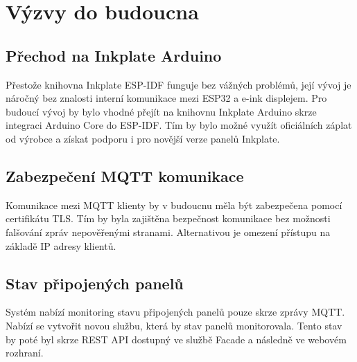 \chapter{Výzvy do budoucna}

\section{Přechod na Inkplate Arduino}
Přestože knihovna Inkplate ESP-IDF funguje bez vážných problémů, její vývoj je náročný bez znalosti interní komunikace mezi ESP32 a e-ink displejem. Pro budoucí vývoj by bylo vhodné přejít na knihovnu Inkplate Arduino skrze integraci Arduino Core do ESP-IDF. Tím by bylo možné využít oficiálních záplat od výrobce a získat podporu i pro novější verze panelů Inkplate.

\section{Zabezpečení MQTT komunikace}
Komunikace mezi MQTT klienty by v budoucnu měla být zabezpečena pomocí certifikátu TLS. Tím by byla zajištěna bezpečnost komunikace bez možnosti falšování zpráv nepověřenými stranami. Alternativou je omezení přístupu na základě IP adresy klientů. 

\section{Stav připojených panelů}
Systém nabízí monitoring stavu připojených panelů pouze skrze zprávy MQTT. Nabízí se vytvořit novou službu, která by stav panelů monitorovala. Tento stav by poté byl skrze REST API dostupný ve službě Facade a následně ve webovém rozhraní.